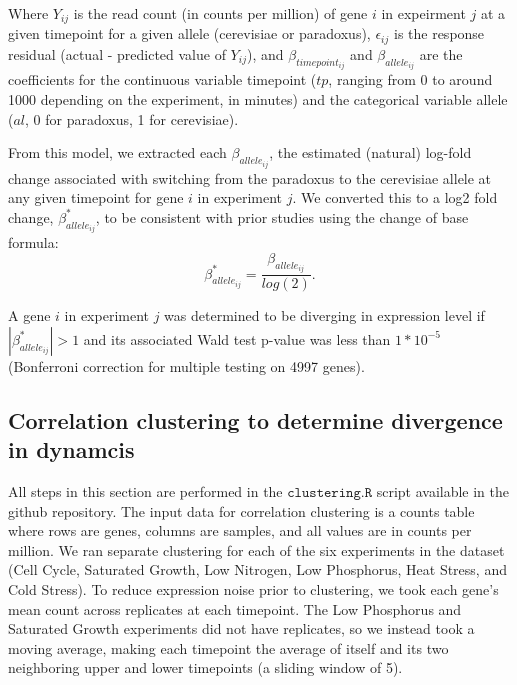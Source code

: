 Where $Y_{ij}$ is the read count (in counts per million) of gene $i$ in expeirment $j$ at a given timepoint for a given allele (cerevisiae or paradoxus), $\epsilon_{ij}$ is the response residual (actual - predicted value of $Y_{ij}$), and $\beta_{timepoint_{ij}}$ and $\beta_{allele_{ij}}$ are the coefficients for the continuous variable timepoint ($tp$, ranging from 0 to around 1000 depending on the experiment, in minutes) and the categorical variable allele ($al$, 0 for paradoxus, 1 for cerevisiae).

From this model, we extracted each $\beta_{allele_{ij}}$, the estimated (natural) log-fold change associated with switching from the paradoxus to the cerevisiae allele at any given timepoint for gene $i$ in experiment $j$. We converted this to a log2 fold change, $\beta^*_{allele_{ij}}$, to be consistent with prior studies using the change of base formula: $$\beta^*_{allele_{ij}} = \frac{\beta_{allele_{ij}}}{log(2)}.$$

A gene $i$ in experiment $j$ was determined to be diverging in expression level if $|\beta^*_{allele_{ij}}| > 1$ and its associated Wald test p-value was less than $1*10^{-5}$ (Bonferroni correction for multiple testing on 4997 genes).


\subsection{Correlation clustering to determine divergence in dynamcis}

All steps in this section are performed in the $\texttt{clustering.R}$ script available in the github repository. The input data for correlation clustering is a counts table where rows are genes, columns are samples, and all values are in counts per million. We ran separate clustering for each of the six experiments in the dataset (Cell Cycle, Saturated Growth, Low Nitrogen, Low Phosphorus, Heat Stress, and Cold Stress). To reduce expression noise prior to clustering, we took each gene's mean count across replicates at each timepoint. The Low Phosphorus and Saturated Growth experiments did not have replicates, so we instead took a moving average, making each timepoint the average of itself and its two neighboring upper and lower timepoints (a sliding window of 5).

